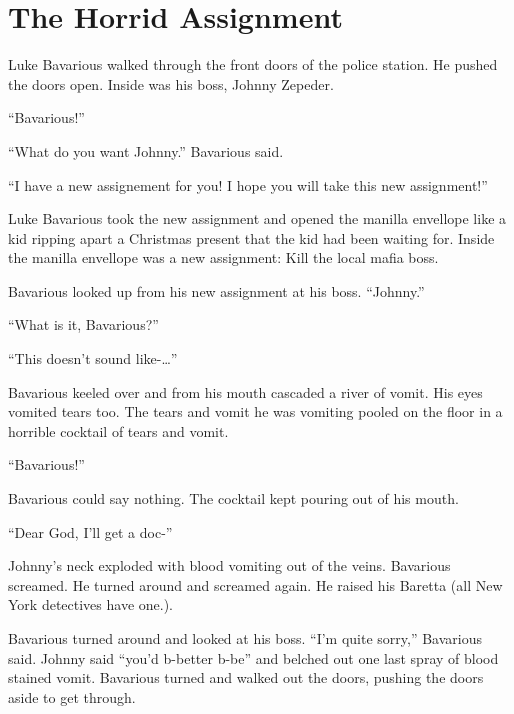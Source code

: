 \chapter{The Horrid Assignment}





Luke Bavarious walked through the front doors of the police
station. He pushed the doors open. Inside was his boss, Johnny
Zepeder.



``Bavarious!''

``What do you want Johnny.'' Bavarious said.

``I have a new assignement for you! I hope you will take this new
assignment!''



Luke Bavarious took the new assignment and opened the manilla
envellope like a kid ripping apart a Christmas present that the kid
had been waiting for. Inside the manilla envellope was a new
assignment: Kill the local mafia boss.



Bavarious looked up from his new assignment at his boss.
``Johnny.''



``What is it, Bavarious?''

``This doesn't sound like-{\ldots}''



Bavarious keeled over and from his mouth cascaded a river of vomit.
His eyes vomited tears too. The tears and vomit he was vomiting
pooled on the floor in a horrible cocktail of tears and
vomit.



``Bavarious!''



Bavarious could say nothing. The cocktail kept pouring out of his
mouth.



``Dear God, I'll get a doc-''



Johnny's neck exploded with blood vomiting out of the veins.
Bavarious screamed. He turned around and screamed again. He raised
his Baretta (all New York detectives have one.).



Bavarious turned around and looked at his boss. ``I'm quite sorry,''
Bavarious said. Johnny said ``you'd b-better b-be'' and belched out
one last spray of blood stained vomit. Bavarious turned and walked
out the doors, pushing the doors aside to get through.



